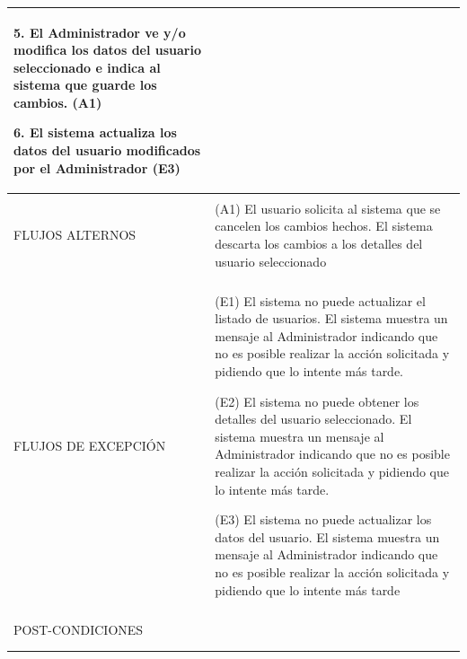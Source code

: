 \begin{longtable}{@{\extracolsep{8pt}}l p{8.5cm}}
 5. El Administrador ve y/o modifica los datos del usuario seleccionado e indica al sistema que guarde los cambios. (A1) \par\vspace{.1cm}

 6. El sistema actualiza los datos del usuario modificados por el Administrador (E3) \par\vspace{.1cm}

\\
\hline \\[-1ex]

FLUJOS ALTERNOS & 
\par (A1) El usuario solicita al sistema que se cancelen los cambios hechos. El sistema descarta los cambios a los detalles del usuario seleccionado



\\
\hline \\[-1ex]

FLUJOS DE EXCEPCIÓN & 
\par\vspace{.1cm} (E1) El sistema no puede actualizar el listado de usuarios. El sistema muestra un mensaje al Administrador indicando que no es posible realizar la acción solicitada y pidiendo que lo intente más tarde.

\par\vspace{.1cm} (E2) El sistema no puede obtener los detalles del usuario seleccionado. El sistema muestra un mensaje al Administrador indicando que no es posible realizar la acción solicitada y pidiendo que lo intente más tarde.

\par\vspace{.1cm} (E3) El sistema no puede actualizar los datos del usuario. El sistema muestra un mensaje al Administrador indicando que no es posible realizar la acción solicitada y pidiendo que lo intente más tarde


\\%

\hline \\[-1ex]
POST-CONDICIONES & 
\\
\hline
\hline \\[-1.8ex]
 \\
\end{longtable}


\pagebreak


